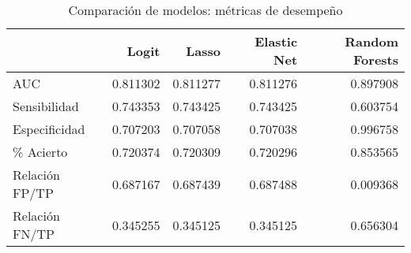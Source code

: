 \begin{table}[H]
\centering
\begin{tabular}{lrrrr}
\toprule
 & \textbf{Logit} & \textbf{Lasso} & \textbf{Elastic Net} & \textbf{Random Forests} \\
\midrule
AUC             & 0.811302 & 0.811277 & 0.811276 & 0.897908 \\
Sensibilidad    & 0.743353 & 0.743425 & 0.743425 & 0.603754 \\
Especificidad   & 0.707203 & 0.707058 & 0.707038 & 0.996758 \\
\% Acierto      & 0.720374 & 0.720309 & 0.720296 & 0.853565 \\
Relación FP/TP  & 0.687167 & 0.687439 & 0.687488 & 0.009368 \\
Relación FN/TP  & 0.345255 & 0.345125 & 0.345125 & 0.656304 \\
\bottomrule
\end{tabular}
\caption{Comparación de modelos: métricas de desempeño}
\label{tab:model_comparison}
\end{table}